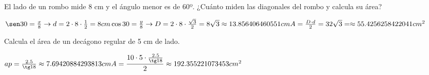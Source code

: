 \documentclass[addpoints,spanish, 12pt,a4paper]{exam}
\begin{document}
\begin{questions}
\addpoints


\question[2]  El lado de un rombo mide
8 cm y el ángulo menor es de 60º. ¿Cuánto miden
las diagonales del rombo y calcula su área?
\begin{solution} $\sen 30 = \frac{x}{8} \to d=2\cdot8\cdot\frac{1}{2}=8 cm \\
\cos 30 = \frac{y}{8} \to D=2\cdot8\cdot\frac{\sqrt{3}}{2}=8\sqrt{3}\approx13.856406460551 cm \\
A=\frac{D\cdot d}{2}=32\sqrt{3}=\approx55.4256258422041 cm^2$ \end{solution}

\question[1] Calcula el área de un decágono regular de 5 cm de lado.
\begin{solution}$ ap = \frac{2.5}{\tg18}\approx7.69420884293813 cm \\ A=\dfrac{10\cdot5\cdot\frac{2.5}{\tg18}}{2}\approx192.355221073453 cm^2 $ \end{solution}


\end{questions}
\end{document}
